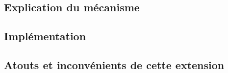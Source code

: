 \subsection{Explication du mécanisme}
\subsection{Implémentation}
\subsection{Atouts et inconvénients de cette extension}

